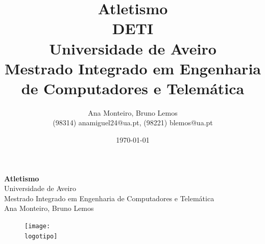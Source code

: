 \documentclass{report}
\begin{document}
\def\titulo{\textbf{\Huge{Atletismo}}}
\def\data{\today}
\def\autores{Ana Monteiro, Bruno Lemos}
\def\autorescontactos{(98314) anamiguel24@ua.pt, (98221) blemos@ua.pt}
\def\departamento{\ac{DETI}}
\def\empresa{Universidade de Aveiro \\ Mestrado Integrado em Engenharia de Computadores e Telemática}
\def\logotipo{ua.pdf}

\begin{titlepage}

\begin{center}
%
\vspace*{50mm}
%
{\Huge \titulo}\\ 
%
\vspace{10mm}
%
{\Large \empresa}\\
%
\vspace{10mm}
%
{\LARGE \autores}\\ 
%
\vspace{30mm}
%
\begin{figure}[h]
\center
\texttt{[image: \\logotipo]}
\end{figure}
%
\vspace{30mm}
\end{center}
%
\begin{flushright}
\end{flushright}
\end{titlepage}

\title{%
{\Huge\textbf{\titulo}}\\
{\Large \departamento\\ \empresa}
}
%
\author{%
    \autores \\
    \autorescontactos
}
%
\date{\data}
%
\maketitle

\end{document}
